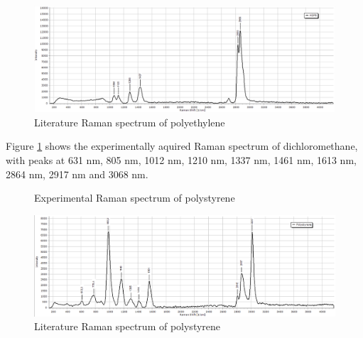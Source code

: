 \begin{figure}[h]
    \centering
    \includegraphics[width=\textwidth]{images/lit_raman/HDPE.png}
    \caption{Literature Raman spectrum of polyethylene \cite{spectrap}}
\end{figure}

Figure \ref{fig:ps_x} shows the experimentally aquired Raman spectrum of dichloromethane, with peaks at 631 nm, 805 nm, 1012 nm, 1210 nm, 1337 nm, 1461 nm, 1613 nm, 2864 nm, 2917 nm and 3068 nm.

\begin{figure}[h]
    \centering
    \caption{Experimental Raman spectrum of polystyrene}
    \label{fig:ps_x}
\end{figure}

\begin{figure}[h]
    \centering
    \includegraphics[width=\textwidth]{images/lit_raman/PS.png}
    \caption{Literature Raman spectrum of polystyrene \cite{spectrap}}
\end{figure}
